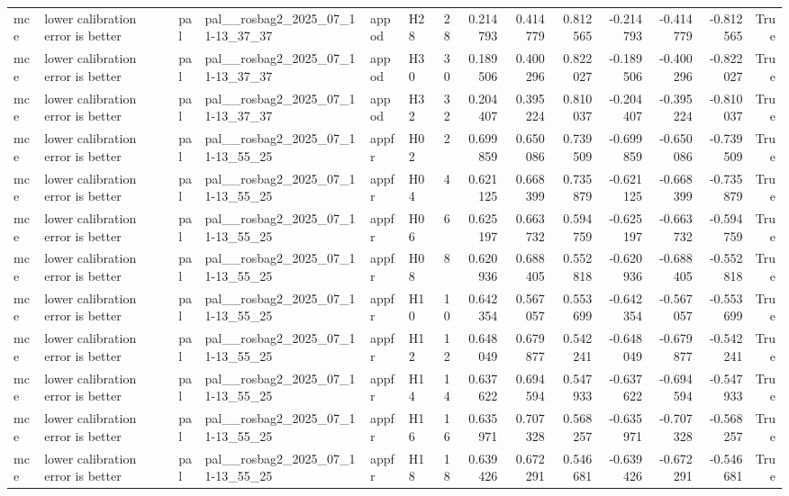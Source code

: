 \begin{longtable}{llllllrrrrrrrr}
mce & lower calibration error is better & pal & pal\_\_rosbag2\_2025\_07\_11-13\_37\_37 & appod & H28 & 28 & 0.214793 & 0.414779 & 0.812565 & -0.214793 & -0.414779 & -0.812565 & True \\
mce & lower calibration error is better & pal & pal\_\_rosbag2\_2025\_07\_11-13\_37\_37 & appod & H30 & 30 & 0.189506 & 0.400296 & 0.822027 & -0.189506 & -0.400296 & -0.822027 & True \\
mce & lower calibration error is better & pal & pal\_\_rosbag2\_2025\_07\_11-13\_37\_37 & appod & H32 & 32 & 0.204407 & 0.395224 & 0.810037 & -0.204407 & -0.395224 & -0.810037 & True \\
mce & lower calibration error is better & pal & pal\_\_rosbag2\_2025\_07\_11-13\_55\_25 & appfr & H02 & 2 & 0.699859 & 0.650086 & 0.739509 & -0.699859 & -0.650086 & -0.739509 & True \\
mce & lower calibration error is better & pal & pal\_\_rosbag2\_2025\_07\_11-13\_55\_25 & appfr & H04 & 4 & 0.621125 & 0.668399 & 0.735879 & -0.621125 & -0.668399 & -0.735879 & True \\
mce & lower calibration error is better & pal & pal\_\_rosbag2\_2025\_07\_11-13\_55\_25 & appfr & H06 & 6 & 0.625197 & 0.663732 & 0.594759 & -0.625197 & -0.663732 & -0.594759 & True \\
mce & lower calibration error is better & pal & pal\_\_rosbag2\_2025\_07\_11-13\_55\_25 & appfr & H08 & 8 & 0.620936 & 0.688405 & 0.552818 & -0.620936 & -0.688405 & -0.552818 & True \\
mce & lower calibration error is better & pal & pal\_\_rosbag2\_2025\_07\_11-13\_55\_25 & appfr & H10 & 10 & 0.642354 & 0.567057 & 0.553699 & -0.642354 & -0.567057 & -0.553699 & True \\
mce & lower calibration error is better & pal & pal\_\_rosbag2\_2025\_07\_11-13\_55\_25 & appfr & H12 & 12 & 0.648049 & 0.679877 & 0.542241 & -0.648049 & -0.679877 & -0.542241 & True \\
mce & lower calibration error is better & pal & pal\_\_rosbag2\_2025\_07\_11-13\_55\_25 & appfr & H14 & 14 & 0.637622 & 0.694594 & 0.547933 & -0.637622 & -0.694594 & -0.547933 & True \\
mce & lower calibration error is better & pal & pal\_\_rosbag2\_2025\_07\_11-13\_55\_25 & appfr & H16 & 16 & 0.635971 & 0.707328 & 0.568257 & -0.635971 & -0.707328 & -0.568257 & True \\
mce & lower calibration error is better & pal & pal\_\_rosbag2\_2025\_07\_11-13\_55\_25 & appfr & H18 & 18 & 0.639426 & 0.672291 & 0.546681 & -0.639426 & -0.672291 & -0.546681 & True \\

\end{longtable}

